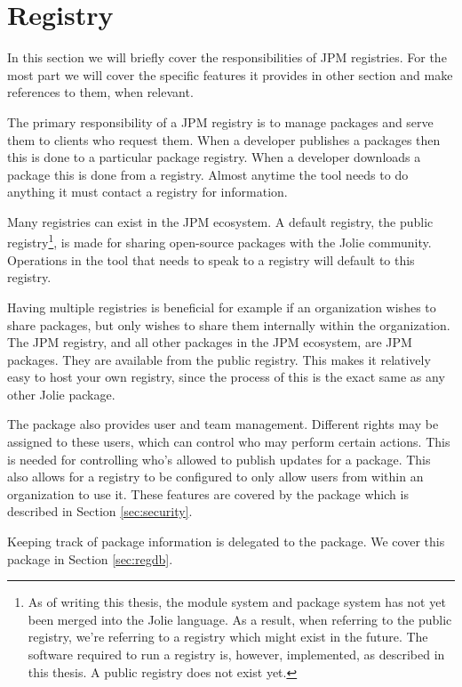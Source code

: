 \section{Registry}
\label{sec:registry}

In this section we will briefly cover the responsibilities of JPM registries.
For the most part we will cover the specific features it provides in other
section and make references to them, when relevant.

The primary responsibility of a JPM registry is to manage packages and serve
them to clients who request them. When a developer publishes a packages then
this is done to a particular package registry. When a developer downloads a
package this is done from a registry. Almost anytime the  tool needs
to do anything it must contact a registry for information.

Many registries can exist in the JPM ecosystem. A default registry, the public
registry\footnote{As of writing this thesis, the module system and package
    system has not yet been merged into the Jolie language. As a result, when
    referring to the public registry, we're referring to a registry which might
    exist in the future. The software required to run a registry is, however,
    implemented, as described in this thesis. A public registry does
    not exist yet.}, is made for sharing open-source packages with the Jolie
community. Operations in the  tool that needs to speak to a registry
will default to this registry.

Having multiple registries is beneficial for example if an organization wishes
to share packages, but only wishes to share them internally within the
organization. The JPM registry, and all other packages in the JPM ecosystem,
are JPM packages. They are available from the public registry. This makes it
relatively easy to host your own registry, since the process of this is the
exact same as any other Jolie package.

The \registry package also provides user and team management. Different rights
may be assigned to these users, which can control who may perform certain
actions. This is needed for controlling who's allowed to publish updates for a
package. This also allows for a registry to be configured to only allow users
from within an organization to use it. These features are covered by the
\security package which is described in Section \ref{sec:security}.

Keeping track of package information is delegated to the \regdb package. We
cover this package in Section \ref{sec:regdb}.
